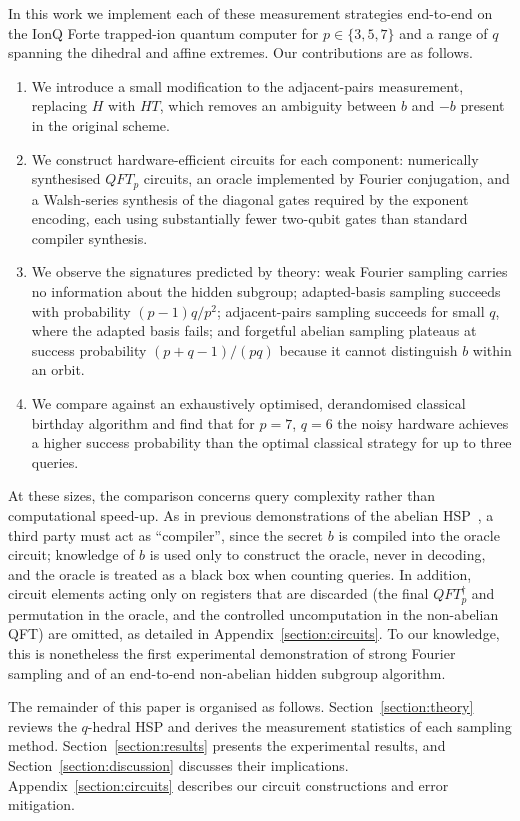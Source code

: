 \documentclass[aps,floatfix,10pt,amssymb,amsfont,amsmath,superscriptaddress,float,nofootinbib,longbibliography,nobalancelastpage,twocolumn]{revtex4-2}
\begin{document}
In this work we implement each of these measurement strategies end-to-end on the IonQ Forte trapped-ion quantum computer for $p \in \{3,5,7\}$ and a range of $q$ spanning the dihedral and affine extremes. Our contributions are as follows.
\begin{enumerate}
    \item We introduce a small modification to the adjacent-pairs measurement, replacing $H$ with $HT$, which removes an ambiguity between $b$ and $-b$ present in the original scheme.
    \item We construct hardware-efficient circuits for each component: numerically synthesised $QFT_p$ circuits, an oracle implemented by Fourier conjugation, and a Walsh-series synthesis of the diagonal gates required by the exponent encoding, each using substantially fewer two-qubit gates than standard compiler synthesis.
    \item We observe the signatures predicted by theory: weak Fourier sampling carries no information about the hidden subgroup; adapted-basis sampling succeeds with probability $(p-1)q/p^2$; adjacent-pairs sampling succeeds for small $q$, where the adapted basis fails; and forgetful abelian sampling plateaus at success probability $(p+q-1)/(pq)$ because it cannot distinguish $b$ within an orbit.
    \item We compare against an exhaustively optimised, derandomised classical birthday algorithm and find that for $p=7$, $q=6$ the noisy hardware achieves a higher success probability than the optimal classical strategy for up to three queries.
\end{enumerate}

At these sizes, the comparison concerns query complexity rather than computational speed-up. As in previous demonstrations of the abelian HSP~\cite{singkanipa2025demonstration}, a third party must act as ``compiler'', since the secret $b$ is compiled into the oracle circuit; knowledge of $b$ is used only to construct the oracle, never in decoding, and the oracle is treated as a black box when counting queries. In addition,  circuit elements acting only on registers that are discarded (the final $QFT_p^\dagger$ and permutation in the oracle, and the controlled uncomputation in the non-abelian QFT) are omitted, as detailed in Appendix~\ref{section:circuits}. To our knowledge, this is nonetheless the first experimental demonstration of strong Fourier sampling and of an end-to-end non-abelian hidden subgroup algorithm.

The remainder of this paper is organised as follows. Section~\ref{section:theory} reviews the $q$-hedral HSP and derives the measurement statistics of each sampling method. Section~\ref{section:results} presents the experimental results, and Section~\ref{section:discussion} discusses their implications. Appendix~\ref{section:circuits} describes our circuit constructions and error mitigation.
\end{document}
